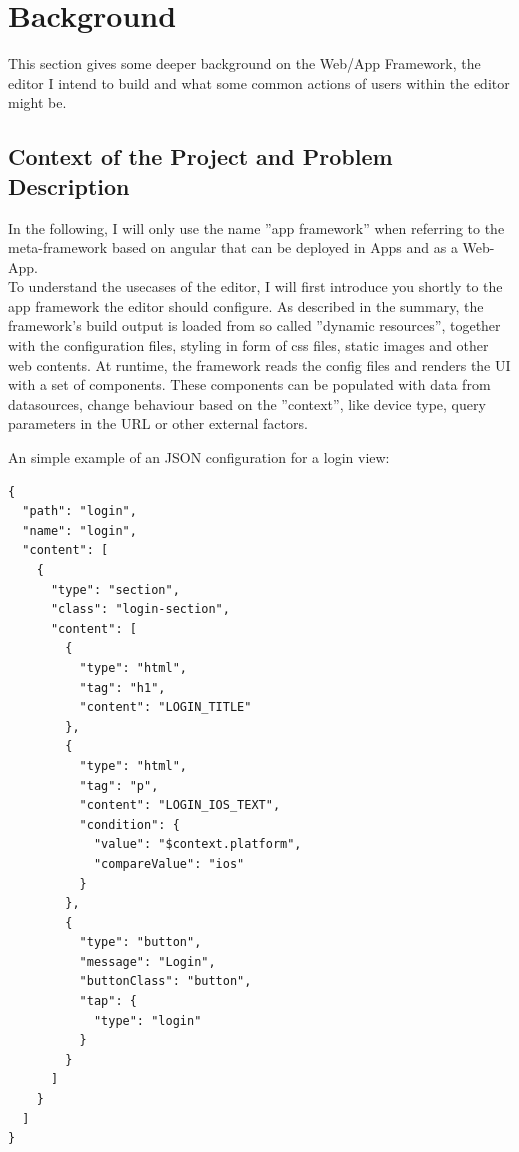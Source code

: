 \section{Background}
\label{sec:background}
This section gives some deeper background on the Web/App Framework, the editor I intend to build and what some common actions of users within the editor might be.
\subsection{Context of the Project and Problem Description} 
\label{sec:context}
In the following, I will only use the name ''app framework'' when referring to the meta-framework based on angular that can be deployed in Apps and as a Web-App.\\

To understand the usecases of the editor, I will first introduce you shortly to the app framework the editor should configure.
As described in the summary, the framework's build output is loaded from so called ''dynamic resources'', together with the configuration files, styling in form of css files, static images and other web contents.
At runtime, the framework reads the config files and renders the UI with a set of components. These components can be populated with data from datasources, change behaviour based on the ''context'', like device type,
query parameters in the URL or other external factors.

An simple example of an JSON configuration for a login view:

\begin{verbatim}
{
  "path": "login",
  "name": "login",
  "content": [
    {
      "type": "section",
      "class": "login-section",
      "content": [
        {
          "type": "html",
          "tag": "h1",
          "content": "LOGIN_TITLE"
        },
        {
          "type": "html",
          "tag": "p",
          "content": "LOGIN_IOS_TEXT",
          "condition": {
            "value": "$context.platform",
            "compareValue": "ios"
          }
        },
        {
          "type": "button",
          "message": "Login",
          "buttonClass": "button",
          "tap": {
            "type": "login"
          }
        }
      ]
    }
  ]
}
\end{verbatim}

